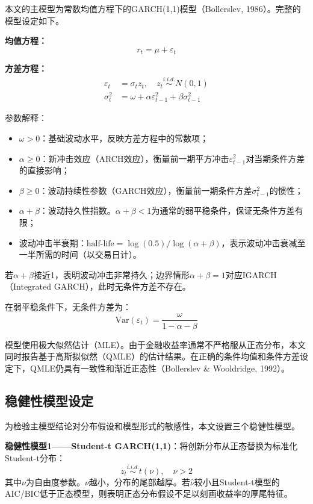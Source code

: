 \documentclass[11pt,a4paper]{article}
\begin{document}
本文的主模型为常数均值方程下的GARCH(1,1)模型（Bollerslev, 1986）。完整的模型设定如下。

\textbf{均值方程：}
\[
r_t = \mu + \varepsilon_t
\]

\textbf{方差方程：}
\begin{align}
\varepsilon_t &= \sigma_t z_t, \quad z_t \stackrel{i.i.d.}{\sim} N(0,1) \\
\sigma_t^2 &= \omega + \alpha \varepsilon_{t-1}^2 + \beta \sigma_{t-1}^2
\end{align}

参数解释：
\begin{itemize}[nosep]
\item \(\omega > 0\)：基础波动水平，反映方差方程中的常数项；
\item \(\alpha \geq 0\)：新冲击效应（ARCH效应），衡量前一期平方冲击\(\varepsilon_{t-1}^2\)对当期条件方差的直接影响；
\item \(\beta \geq 0\)：波动持续性参数（GARCH效应），衡量前一期条件方差\(\sigma_{t-1}^2\)的惯性；
\item \(\alpha + \beta\)：波动持久性指数。\(\alpha + \beta < 1\)为通常的弱平稳条件，保证无条件方差有限；
\item 波动冲击半衰期：\(\text{half-life} = \log(0.5) / \log(\alpha + \beta)\)，表示波动冲击衰减至一半所需的时间（以交易日计）。
\end{itemize}

若\(\alpha + \beta\)接近1，表明波动冲击非常持久；边界情形\(\alpha + \beta = 1\)对应IGARCH（Integrated GARCH），此时无条件方差不存在。

在弱平稳条件下，无条件方差为：
\[
\text{Var}(\varepsilon_t) = \frac{\omega}{1 - \alpha - \beta}
\]

模型使用极大似然估计（MLE）。由于金融收益率通常不严格服从正态分布，本文同时报告基于高斯拟似然（QMLE）的估计结果。在正确的条件均值和条件方差设定下，QMLE仍具有一致性和渐近正态性（Bollerslev \& Wooldridge, 1992）。

\subsection{稳健性模型设定}

为检验主模型结论对分布假设和模型形式的敏感性，本文设置三个稳健性模型。

\textbf{稳健性模型1——Student-t GARCH(1,1)}：将创新分布从正态替换为标准化Student-t分布：
\[
z_t \stackrel{i.i.d.}{\sim} t(\nu), \quad \nu > 2
\]
其中\(\nu\)为自由度参数。\(\nu\)越小，分布的尾部越厚。若\(\hat{\nu}\)较小且Student-t模型的AIC/BIC低于正态模型，则表明正态分布假设不足以刻画收益率的厚尾特征。
\end{document}
